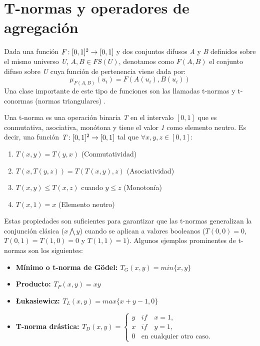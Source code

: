 \section{T-normas y operadores de agregación}\label{sec:t-norms-aggregation-operator}
Dada una función \begin{math}\emph{F}:[0,1]^2\rightarrow[0,1]\end{math} y dos conjuntos difusos \emph{A} y \emph{B} definidos sobre el mismo universo \emph{U}, \begin{math}A,B\in FS(U)\end{math}, denotamos como \begin{math}F(A,B)\end{math} el conjunto difuso sobre \emph{U} cuya función de pertenencia viene dada por:
\begin{equation}
\mu_{F(A,B)}(u_{i}) = F(A(u_{i}),B(u_{i}))
\end{equation}
Una clase importante de este tipo de funciones son las llamadas t-normas y t-conormas (normas triangulares) \cite{klement2000triangular}.
\begin{definition}\label{def:tnorma}
Una t-norma es una operación binaria \emph{T} en el intervalo $[0,1]$ que es conmutativa, asociativa, monótona y tiene el valor \emph{1} como elemento neutro. Es decir, una función $\emph{T} : [0,1]^2 \rightarrow [0,1]$ tal que $\forall x,y,z \in [0,1]$:
\begin{enumerate}[label=(T\arabic*),ref=(T\arabic*)]
   \item $T(x,y) = T(y,x)$ (Conmutatividad)\label{T1}
   \item $T(x,T(y,z)) = T(T(x,y),z)$ (Asociatividad)\label{T2}
   \item $T(x,y) \leq T(x,z)$ cuando $y \leq z$ (Monotonía)\label{T3}
   \item $T(x,1) = x$ (Elemento neutro)\label{T4}
  \end{enumerate}
\end{definition}
Estas propiedades son suficientes para garantizar que las t-normas generalizan la conjunción clásica ($x\bigwedge y$) cuando se aplican a valores booleanos ($T(0,0)=0$,$T(0,1)=T(1,0)=0$ y $T(1,1)=1$).
Algunos ejemplos prominentes de t-normas son los siguientes:
\begin{itemize}
	\item \bfseries Mínimo o t-norma de Gödel: $T_{G}(x,y) = min\{x,y\}$
	\item \bfseries Producto: $T_{P}(x,y) = xy$
	\item \bfseries \L{}ukasiewicz: $T_{L}(x,y) = max\{x+y-1,0\}$
	\item \bfseries T-norma drástica: \mdseries $T_{D}(x,y) = \begin{cases} y & if\quad x=1, \\ x & if\quad y=1, \\0 & \text{en cualquier otro caso}. \end{cases}$
\end{itemize}
